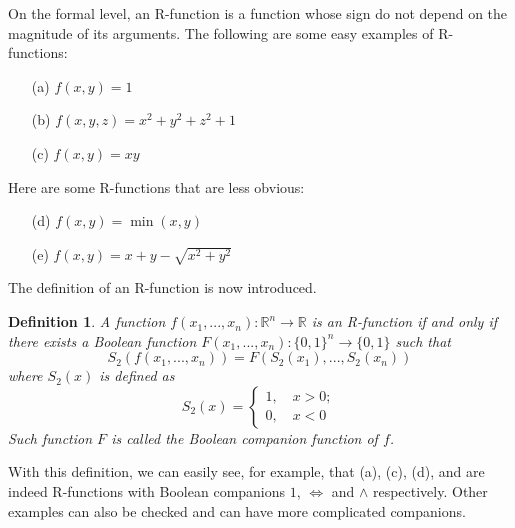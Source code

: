 \documentclass[11pt]{amsart}
\newtheorem{definition}{Definition}%
\theoremstyle{definition}
\begin{document}
On the formal level, an R-function is a function whose sign do not depend on the magnitude of its arguments.  The following are some easy  examples of R-functions: 
\begin{enumerate}
\item[(a)] $f(x,y) = 1$
\item[(b)] $f(x,y,z) = x^2+y^2+z^2+1$
\item[(c)] $f(x,y) = xy$
\end{enumerate}
Here are some R-functions that are less obvious:
\begin{enumerate}
\item[(d)] $f(x,y) = \min(x,y)$
\item[(e)] $f(x,y) = x+y-\sqrt{x^2+y^2}$
\end{enumerate}
The definition of an R-function is now introduced.
\begin{definition}
A function $f(x_1,...,x_n):\mathbb{R}^n\to\mathbb{R}$ is an R-function if and only if there exists a Boolean function $F(x_1,...,x_n):\{0,1\}^n\to \{0,1\}$ such that
$$S_2(f(x_1,...,x_n))=F(S_2(x_1),...,S_2(x_n))$$
where $S_2(x)$ is defined as
$$S_2(x)=\begin{cases} 1,\quad x>0;\\ 0, \quad x<0\end{cases}$$
Such function $F$ is called the Boolean companion function of $f$.
\end{definition}

With this definition, we can easily see, for example, that (a), (c), (d), and are indeed R-functions with Boolean companions $1$, $\Leftrightarrow$ and $\wedge$
respectively. Other examples can also be checked and can have more complicated
companions. 
\end{document}
